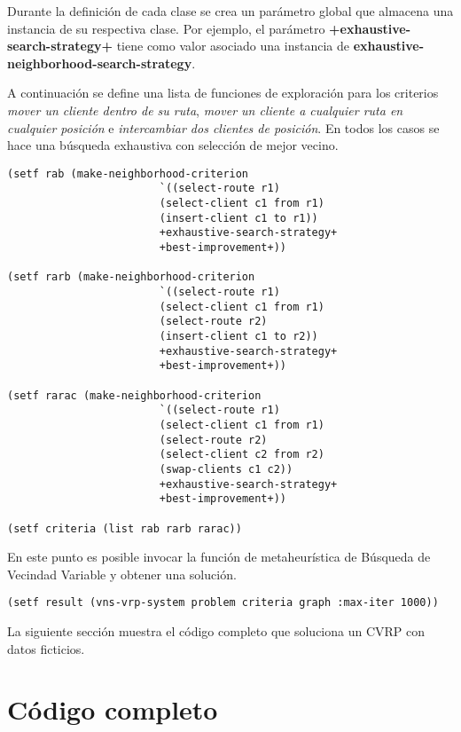 Durante la definición de cada clase se crea un parámetro global que almacena una instancia de su respectiva clase. Por ejemplo, el parámetro \textbf{+exhaustive-search-strategy+} tiene como valor asociado una instancia de \textbf{exhaustive-neighborhood-search-strategy}.

A continuación se define una lista de funciones de exploración para los criterios \textit{mover un cliente dentro de su ruta}, \textit{mover un cliente a cualquier ruta en cualquier posición} e \textit{intercambiar dos clientes de posición}. En todos los casos se hace una búsqueda exhaustiva con selección de mejor vecino.

\begin{lstlisting}
(setf rab (make-neighborhood-criterion 
						`((select-route r1)
						(select-client c1 from r1)
						(insert-client c1 to r1))
						+exhaustive-search-strategy+ 
						+best-improvement+))

(setf rarb (make-neighborhood-criterion 
						`((select-route r1)
						(select-client c1 from r1)
						(select-route r2)
						(insert-client c1 to r2))
						+exhaustive-search-strategy+ 
						+best-improvement+))

(setf rarac (make-neighborhood-criterion 
						`((select-route r1)
						(select-client c1 from r1)
						(select-route r2)
						(select-client c2 from r2)
						(swap-clients c1 c2))
						+exhaustive-search-strategy+ 
						+best-improvement+))

(setf criteria (list rab rarb rarac))

\end{lstlisting}

En este punto es posible invocar la función de metaheurística de Búsqueda de Vecindad Variable y obtener una solución.

\begin{lstlisting}
(setf result (vns-vrp-system problem criteria graph :max-iter 1000))
\end{lstlisting}

La siguiente sección muestra el código completo que soluciona un CVRP con datos ficticios.

\section{Código completo}\label{4-union}

